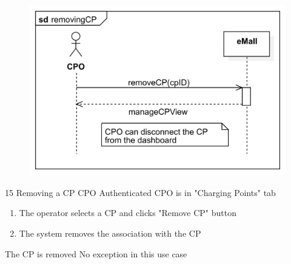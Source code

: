 \usecase
{
    \begin{figure}[H]
        \centering
        \includegraphics[scale=0.9]{src/sequence_diagram/removingCP.png}
    \end{figure}
}
{15}
{Removing a CP} %
{CPO} %
{Authenticated CPO is in "Charging Points" tab} %
{ %
    \begin{enumerate}
        \item The operator selects a CP and clicks "Remove CP" button
        \item The system removes the association with the CP
    \end{enumerate}
}
{The CP is removed} %
{ %
    No exception in this use case
}
{ %
}

